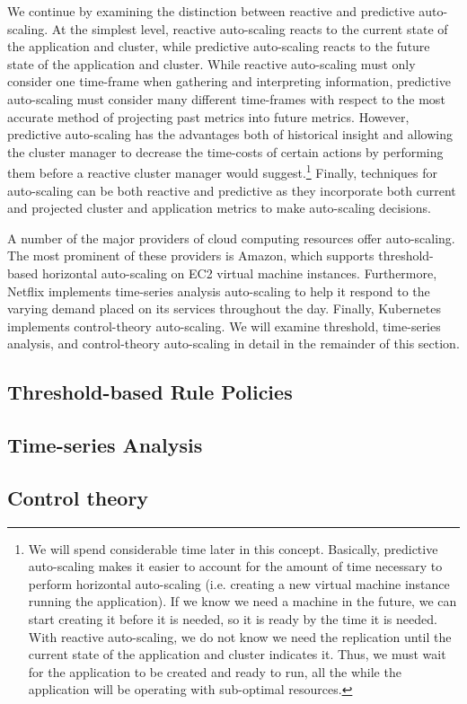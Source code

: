 We continue by examining the distinction between reactive and predictive
auto-scaling. At the simplest level, reactive auto-scaling reacts to
the current state of the application and cluster, while predictive
auto-scaling reacts to the future state of the application and cluster.\cite[pg.
12]{auto-scaling-techniques-for-elastic-applications-in-cloud-environments}
While reactive auto-scaling must only consider one
time-frame when gathering and interpreting information, predictive
auto-scaling must consider many different time-frames with respect to the
most accurate method of projecting past metrics into future metrics. However,
predictive auto-scaling has the advantages both of historical insight and allowing
the cluster manager to decrease the time-costs of certain actions by performing
them before a reactive cluster manager would suggest.\footnote{We will spend
considerable time later in this concept. Basically, predictive auto-scaling
makes it easier to account for the amount of time necessary to perform
horizontal auto-scaling (i.e. creating a new virtual machine instance running
the application). If we know we need a machine in the future, we can start
creating it before it is needed, so it is ready by the time it is needed. With reactive
auto-scaling, we do not know we need the replication until the current state of
the application and cluster indicates it. Thus, we must wait for the
application to be created and ready to run,
all the while the application will be operating with
sub-optimal resources.}
Finally, techniques for auto-scaling can be both reactive and predictive as
they incorporate both current and projected cluster and application metrics
to make auto-scaling decisions.

A number of the major providers of cloud computing resources offer auto-scaling.
The most prominent of these providers is Amazon, which supports threshold-based
horizontal auto-scaling on EC2 virtual machine
instances.\cite{amazon-auto-scaling-developer-guide} Furthermore, Netflix
implements time-series analysis auto-scaling to help it respond to the
varying demand placed on its services throughout the
day.\cite{netflix-scryer-part-i} Finally, Kubernetes
implements control-theory auto-scaling.\cite{k8s-horizontal-pod-autoscaler-proposal}
We will examine threshold, time-series analysis, and control-theory
auto-scaling in detail in the remainder of this section.



\subsection{Threshold-based Rule Policies}



\subsection{Time-series Analysis}



\subsection{Control theory}


